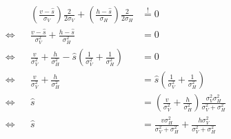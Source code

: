 \documentclass[../main/Notes.tex]{subfiles}
\begin{document}
\begin{align*}
& & \left(\frac{v-\hat{s}}{\sigma_{V}}\right) \frac{2}{2\sigma_{V}} + \left(\frac{h-\hat{s}}{\sigma_{H}}\right) \frac{2}{2\sigma_{H}} & \stackrel{!}{=}0 & & \\
\Leftrightarrow & & \frac{v-\hat{s}}{\sigma_{V}^{2}} + \frac{h-\hat{s}}{\sigma_{H}^{2}} & = 0 & & \\
\Leftrightarrow & & \frac{v}{\sigma_{V}^{2}} + \frac{h}{\sigma_{H}^{2}} -\hat{s} \left(\frac{1}{\sigma_{V}^{2}} + \frac{1}{\sigma_{H}^{2}}\right) & = 0 & & \\
\Leftrightarrow & & \frac{v}{\sigma_{V}^{2}} + \frac{h}{\sigma_{H}^{2}} & = \hat{s} \left(\frac{1}{\sigma_{V}^{2}} + \frac{1}{\sigma_{H}^{2}}\right) & & \\
\Leftrightarrow & & \hat{s} & = \left(\frac{v}{\sigma_{V}^{2}} + \frac{h}{\sigma_{H}^{2}}\right) \frac{\sigma_{V}^{2}\sigma_{H}^{2}}{\sigma_{V}^{2} + \sigma_{H}^{2}} & & \\
\Leftrightarrow & & \hat{s} & = \frac{v\sigma_{H}^{2}}{\sigma_{V}^{2} + \sigma_{H}^{2}} + \frac{h\sigma_{V}^{2}}{\sigma_{V}^{2} + \sigma_{H}^{2}} & &
\end{align*}
\end{document}
